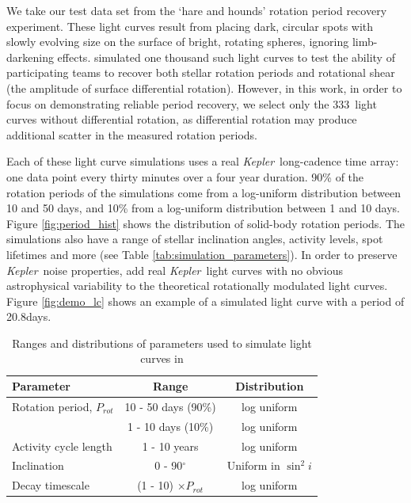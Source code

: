 \documentclass[a4paper,fleqn,usenatbib,useAMS]{mnras}
\newcommand{\Kepler}{{\it Kepler}}
\newcommand{\kepler}{\Kepler}
\newcommand{\naigrain}{333}
\newcommand{\aigrainexampleperiod}{20.8}
\begin{document}
We take our test data set from the \citet{Aigrain2015} `hare and hounds'
rotation period recovery experiment.
These light curves result from placing dark, circular spots with slowly
evolving size on the surface of bright, rotating spheres, ignoring
limb-darkening effects.
\citet{Aigrain2015} simulated one thousand such light curves to test the
ability of participating teams to recover both stellar rotation periods
and rotational shear (the amplitude of surface differential rotation).
However, in this work, in order to focus on demonstrating reliable period recovery,
we select only the \naigrain\ light curves without differential rotation,
as differential rotation may produce additional scatter in the
measured rotation periods.

Each of these light curve simulations uses a real \Kepler\ long-cadence time array:
one data point every thirty minutes over a four year duration.
90\% of the rotation periods of the simulations come from a
log-uniform distribution between 10 and 50 days, and 10\% from a log-uniform
distribution between 1 and 10 days.
Figure \ref{fig:period_hist} shows the distribution of solid-body rotation periods.
The simulations also have a range of stellar inclination
angles, activity levels, spot lifetimes and more
(see Table \ref{tab:simulation_parameters}).
In order to preserve \kepler\ noise properties,
\citet{Aigrain2015} add real \kepler\ light curves with no obvious astrophysical
variability to the theoretical rotationally modulated light curves.
Figure \ref{fig:demo_lc} shows an example of a simulated light curve with a
period of \aigrainexampleperiod days.

\begin{table}
\begin{center}
\caption{Ranges and distributions of parameters used to simulate light curves
in \citet{Aigrain2015}}
\begin{tabular}{lcc}
\hline\hline
    Parameter & Range & Distribution \\
    \hline
    Rotation period, $P_{rot}$ & 10 - 50 days (90\%) & log uniform \\
    & 1 - 10 days (10\%) & log uniform \\
    Activity cycle length & 1 - 10 years & log uniform \\
    Inclination & 0 - 90$^\circ$ & Uniform in $\sin^2i$ \\
    Decay timescale & (1 - 10) $\times P_{rot}$ & log uniform \\
\hline
\end{tabular}
\end{center}
\end{table}
\label{tab:simulation_parameters}
\end{document}
